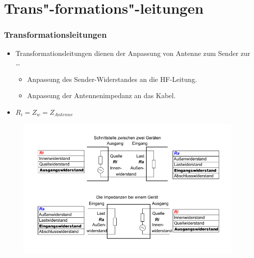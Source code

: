 \section{Trans"-formations"-leitungen}
\begin{frame}
  \frametitle{Transformationsleitungen}
  \begin{itemize}
    \item Transformationsleitungen dienen der Anpassung von Antenne zum Sender zur \dots
      \begin{itemize}
        \item Anpassung des Sender-Widerstandes an die HF-Leitung.
        \item Anpassung der Antennenimpedanz an das Kabel.
      \end{itemize}
    \item $R_i = Z_w = Z_{Antenne}$
  \end{itemize}
\end{frame}

\begin{frame}
  \begin{center}
    \begin{figure}
      \includegraphics[width=\textwidth,height=.8\textheight,keepaspectratio]{a10/800px-EingangswiderstandAusgangswiderstandA.png}
    \end{figure}
  \end{center}
\end{frame}


